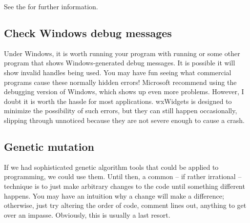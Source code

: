 See the  for further information.

\subsection{Check Windows debug messages}

Under Windows, it is worth running your program with 
 running or
some other program that shows Windows-generated debug messages. It is
possible it will show invalid handles being used. You may have fun seeing
what commercial programs cause these normally hidden errors! Microsoft
recommend using the debugging version of Windows, which shows up even
more problems. However, I doubt it is worth the hassle for most
applications. wxWidgets is designed to minimize the possibility of such
errors, but they can still happen occasionally, slipping through unnoticed
because they are not severe enough to cause a crash.

\subsection{Genetic mutation}

If we had sophisticated genetic algorithm tools that could be applied
to programming, we could use them. Until then, a common -- if rather irrational --
technique is to just make arbitrary changes to the code until something
different happens. You may have an intuition why a change will make a difference;
otherwise, just try altering the order of code, comment lines out, anything
to get over an impasse. Obviously, this is usually a last resort.

